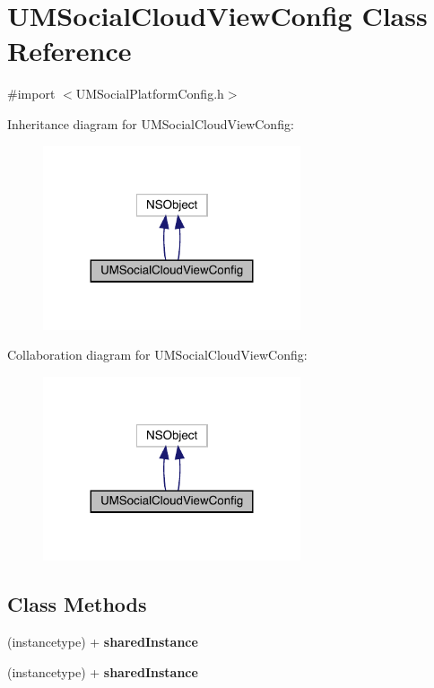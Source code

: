 \hypertarget{interface_u_m_social_cloud_view_config}{}\section{U\+M\+Social\+Cloud\+View\+Config Class Reference}
\label{interface_u_m_social_cloud_view_config}


{\ttfamily \#import $<$U\+M\+Social\+Platform\+Config.\+h$>$}



Inheritance diagram for U\+M\+Social\+Cloud\+View\+Config\+:\nopagebreak
\begin{figure}[H]
\begin{center}
\leavevmode
\includegraphics[width=215pt]{interface_u_m_social_cloud_view_config__inherit__graph}
\end{center}
\end{figure}


Collaboration diagram for U\+M\+Social\+Cloud\+View\+Config\+:\nopagebreak
\begin{figure}[H]
\begin{center}
\leavevmode
\includegraphics[width=215pt]{interface_u_m_social_cloud_view_config__coll__graph}
\end{center}
\end{figure}
\subsection*{Class Methods}
\begin{DoxyCompactItemize}
\item 
\mbox{\label{interface_u_m_social_cloud_view_config_a034b16ba316a6e6d6a3c92860f6918e0}} 
(instancetype) + {\bfseries shared\+Instance}
\item 
\mbox{\label{interface_u_m_social_cloud_view_config_a034b16ba316a6e6d6a3c92860f6918e0}} 
(instancetype) + {\bfseries shared\+Instance}
\end{DoxyCompactItemize}
